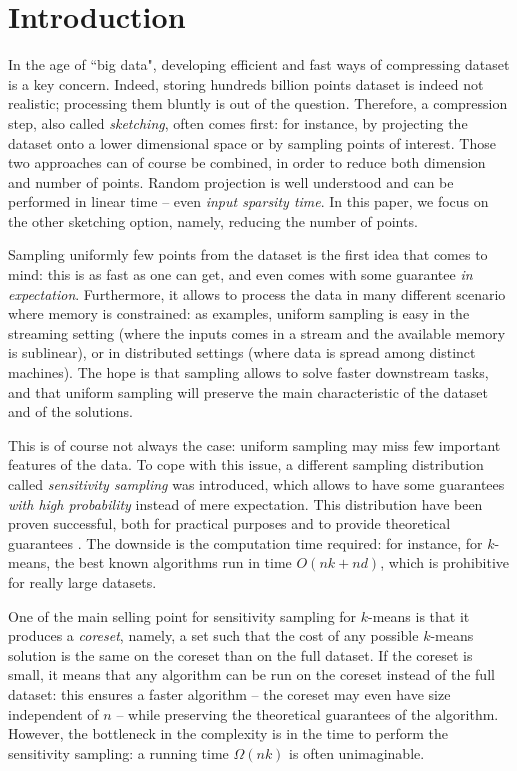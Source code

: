 \section{Introduction}

In the age of ``big data", developing efficient and fast ways of compressing dataset is a key concern. Indeed, storing hundreds billion points dataset is indeed not realistic; processing them bluntly is out of the question. 
Therefore, a compression step, also called \textit{sketching}, often comes first: for instance, by projecting the dataset onto a lower dimensional space or by sampling points of interest. Those two approaches can of course be combined, in order to reduce both dimension and number of points. 
Random projection is well understood and can be performed in linear time -- even \textit{input sparsity time}. 
In this paper, we focus on the other sketching option, namely, reducing the number of points.

Sampling uniformly few points from the dataset is the first idea that comes to mind: this is as fast as one can get, and even comes with some guarantee \emph{in expectation}. 
Furthermore, it allows to process the data in many different scenario where memory is constrained: as examples, uniform sampling is easy in the streaming setting (where the inputs comes in a stream and the available memory is sublinear), or in distributed settings (where data is spread among distinct machines).
The hope is that sampling allows to solve faster downstream tasks, and that uniform sampling will preserve the main characteristic of the dataset and of the solutions.

This is of course not always the case: uniform sampling may miss few important features of the data. 
To cope with this issue, a different sampling distribution called \textit{sensitivity sampling} was introduced, which allows to have some guarantees \textit{with high probability} instead of mere expectation.
This distribution have been proven successful, both for practical purposes \cite{} and to provide theoretical guarantees \cite{}. 
The downside is the computation time required: for instance, for $k$-means, the best known algorithms run in time $O(nk+nd)$, which is prohibitive for really large datasets.

One of the main selling point for sensitivity sampling for $k$-means is that it produces a \textit{coreset}, namely, a set such that the cost of any possible $k$-means solution is the same on the coreset than on the full dataset.
If the coreset is small, it means that any algorithm can be run on the coreset instead of the full dataset: this ensures a faster algorithm  -- the coreset may even have size independent of $n$ -- while preserving the theoretical guarantees of the algorithm.
However, the bottleneck in the complexity is in the time to perform the sensitivity sampling: a running time $\Omega(nk)$ is often 	unimaginable.

